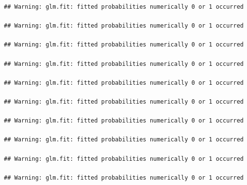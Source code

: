 \documentclass[]{article}
\newenvironment{Shaded}{\begin{snugshade}}{\end{snugshade}}
\newcommand{\KeywordTok}[1]{\textcolor[rgb]{0.13,0.29,0.53}{\textbf{#1}}}
\newcommand{\DataTypeTok}[1]{\textcolor[rgb]{0.13,0.29,0.53}{#1}}
\newcommand{\DecValTok}[1]{\textcolor[rgb]{0.00,0.00,0.81}{#1}}
\newcommand{\StringTok}[1]{\textcolor[rgb]{0.31,0.60,0.02}{#1}}
\newcommand{\OtherTok}[1]{\textcolor[rgb]{0.56,0.35,0.01}{#1}}
\newcommand{\ControlFlowTok}[1]{\textcolor[rgb]{0.13,0.29,0.53}{\textbf{#1}}}
\newcommand{\OperatorTok}[1]{\textcolor[rgb]{0.81,0.36,0.00}{\textbf{#1}}}
\newcommand{\NormalTok}[1]{#1}
\begin{document}
\begin{verbatim}
## Warning: glm.fit: fitted probabilities numerically 0 or 1 occurred

## Warning: glm.fit: fitted probabilities numerically 0 or 1 occurred

## Warning: glm.fit: fitted probabilities numerically 0 or 1 occurred

## Warning: glm.fit: fitted probabilities numerically 0 or 1 occurred

## Warning: glm.fit: fitted probabilities numerically 0 or 1 occurred

## Warning: glm.fit: fitted probabilities numerically 0 or 1 occurred

## Warning: glm.fit: fitted probabilities numerically 0 or 1 occurred

## Warning: glm.fit: fitted probabilities numerically 0 or 1 occurred

## Warning: glm.fit: fitted probabilities numerically 0 or 1 occurred

## Warning: glm.fit: fitted probabilities numerically 0 or 1 occurred
\end{verbatim}

\begin{Shaded}
\end{Shaded}
\end{document}
